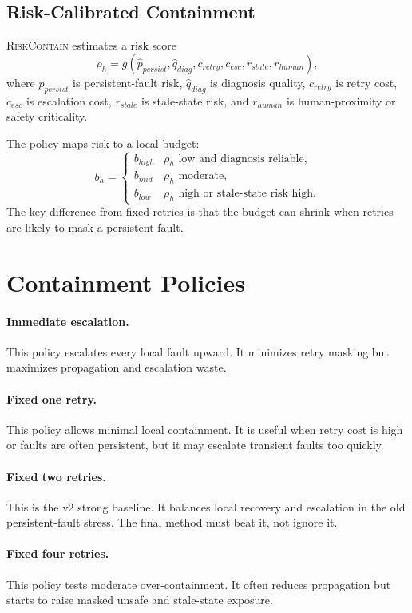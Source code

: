 \documentclass{article}
\newcommand{\method}{\textsc{RiskContain}\xspace}
\begin{document}
\subsection{Risk-Calibrated Containment}

\method estimates a risk score
\[
    \rho_h = g(\hat{p}_{persist}, \hat{q}_{diag}, c_{retry}, c_{esc}, r_{stale}, r_{human}),
\]
where $\hat{p}_{persist}$ is persistent-fault risk, $\hat{q}_{diag}$ is diagnosis quality, $c_{retry}$ is retry cost, $c_{esc}$ is escalation cost, $r_{stale}$ is stale-state risk, and $r_{human}$ is human-proximity or safety criticality.

The policy maps risk to a local budget:
\[
    b_h =
    \begin{cases}
    b_{high} & \rho_h \text{ low and diagnosis reliable},\\
    b_{mid} & \rho_h \text{ moderate},\\
    b_{low} & \rho_h \text{ high or stale-state risk high}.
    \end{cases}
\]
The key difference from fixed retries is that the budget can shrink when retries are likely to mask a persistent fault.

\section{Containment Policies}

\paragraph{Immediate escalation.}
This policy escalates every local fault upward. It minimizes retry masking but maximizes propagation and escalation waste.

\paragraph{Fixed one retry.}
This policy allows minimal local containment. It is useful when retry cost is high or faults are often persistent, but it may escalate transient faults too quickly.

\paragraph{Fixed two retries.}
This is the v2 strong baseline. It balances local recovery and escalation in the old persistent-fault stress. The final method must beat it, not ignore it.

\paragraph{Fixed four retries.}
This policy tests moderate over-containment. It often reduces propagation but starts to raise masked unsafe and stale-state exposure.
\end{document}
